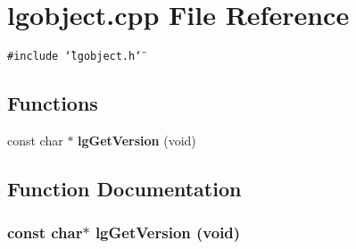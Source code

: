 \section{lgobject.cpp File Reference}
\label{lgobject_8cpp}
{\tt \#include \char`\"{}lgobject.h\char`\"{}}\par
\subsection*{Functions}
\begin{CompactItemize}
\item 
const char $\ast$ {\bf lg\-Get\-Version} (void)
\end{CompactItemize}


\subsection{Function Documentation}
\subsubsection{\setlength{\rightskip}{0pt plus 5cm}const char$\ast$ lg\-Get\-Version (void)}\label{lgobject_8cpp_a0}


